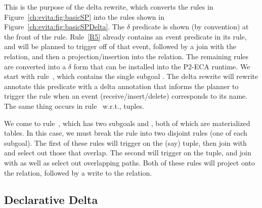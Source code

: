 This is the purpose of the delta rewrite, which converts the rules in
Figure~\ref{ch:evita:fig:basicSP} into the rules shown in
Figure~\ref{ch:evita:fig:basicSPDelta}.  The $\delta$ predicate is shown (by
convention) at the front of the rule.  Rule~\ref{R5} already contains an {\emph
event} predicate in its rule, and will be planned to trigger off of that
 event, followed by a join with the  relation, and
then a projection/insertion into the  relation.  The remaining
rules are converted into a $\delta$ form that can be installed into the P2-ECA
runtime.  We start with rule~, which contains the single subgoal
.  The delta rewrite will rewrite annotate this predicate with a delta
annotation that informs the planner to trigger the rule when an event
(receive/insert/delete) corresponds to its name.  The same thing occurs in
rule~ w.r.t.,  tuples.

We come to rule~, which has two subgoals  and , both
of which are materialized tables.  In this case, we must break the rule into
two disjoint rules (one of each subgoal).  The first of these rules will
trigger on the (say)  tuple, then join with  and select out
those that overlap.  The second will trigger on the  tuple, and join
with  as well as select out overlapping paths.  Both of these rules
will project onto the  relation, followed by a write to the   relation.


\subsection{Declarative Delta}

